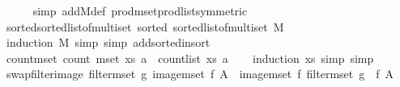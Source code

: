 \begin{isabellebody}
\ \ \ \ \isamarkupfalse%
\ {\isacharparenleft}{\kern0pt}simp\ add{\isacharcolon}{\kern0pt}M{\isacharunderscore}{\kern0pt}def\ prod{\isacharunderscore}{\kern0pt}mset{\isacharunderscore}{\kern0pt}prod{\isacharunderscore}{\kern0pt}list{\isacharbrackleft}{\kern0pt}symmetric{\isacharbrackright}{\kern0pt}{\isacharparenright}{\kern0pt}\isanewline
{}\isamarkupfalse%
%
\endisatagproof
{\isafoldproof}%
%
\isadelimproof
\isanewline
%
\endisadelimproof
\isanewline
{}\isamarkupfalse%
\ sorted{\isacharunderscore}{\kern0pt}sorted{\isacharunderscore}{\kern0pt}list{\isacharunderscore}{\kern0pt}of{\isacharunderscore}{\kern0pt}multiset{\isacharcolon}{\kern0pt}\ {\isachardoublequoteopen}sorted\ {\isacharparenleft}{\kern0pt}sorted{\isacharunderscore}{\kern0pt}list{\isacharunderscore}{\kern0pt}of{\isacharunderscore}{\kern0pt}multiset\ M{\isacharparenright}{\kern0pt}{\isachardoublequoteclose}\isanewline
%
\isadelimproof
\ \ %
\endisadelimproof
%
\isatagproof
{}\isamarkupfalse%
\ {\isacharparenleft}{\kern0pt}induction\ M{\isacharcomma}{\kern0pt}\ simp{\isacharcomma}{\kern0pt}\ simp\ add{\isacharcolon}{\kern0pt}sorted{\isacharunderscore}{\kern0pt}insort{\isacharparenright}{\kern0pt}%
\endisatagproof
{\isafoldproof}%
%
\isadelimproof
\ \isanewline
%
\endisadelimproof
\isanewline
{}\isamarkupfalse%
\ count{\isacharunderscore}{\kern0pt}mset{\isacharcolon}{\kern0pt}\ {\isachardoublequoteopen}count\ {\isacharparenleft}{\kern0pt}mset\ xs{\isacharparenright}{\kern0pt}\ a\ {\isacharequal}{\kern0pt}\ count{\isacharunderscore}{\kern0pt}list\ xs\ a{\isachardoublequoteclose}\isanewline
%
\isadelimproof
\ \ %
\endisadelimproof
%
\isatagproof
{}\isamarkupfalse%
\ {\isacharparenleft}{\kern0pt}induction\ xs{\isacharcomma}{\kern0pt}\ simp{\isacharcomma}{\kern0pt}\ simp{\isacharparenright}{\kern0pt}%
\endisatagproof
{\isafoldproof}%
%
\isadelimproof
\isanewline
%
\endisadelimproof
\isanewline
{}\isamarkupfalse%
\ swap{\isacharunderscore}{\kern0pt}filter{\isacharunderscore}{\kern0pt}image{\isacharcolon}{\kern0pt}\ {\isachardoublequoteopen}filter{\isacharunderscore}{\kern0pt}mset\ g\ {\isacharparenleft}{\kern0pt}image{\isacharunderscore}{\kern0pt}mset\ f\ A{\isacharparenright}{\kern0pt}\ {\isacharequal}{\kern0pt}\ image{\isacharunderscore}{\kern0pt}mset\ f\ {\isacharparenleft}{\kern0pt}filter{\isacharunderscore}{\kern0pt}mset\ {\isacharparenleft}{\kern0pt}g\ {\isasymcirc}\ f{\isacharparenright}{\kern0pt}\ A{\isacharparenright}{\kern0pt}{\isachardoublequoteclose}\isanewline
%
\isadelimproof
\ \ %
\endisadelimproof

\end{isabellebody}
